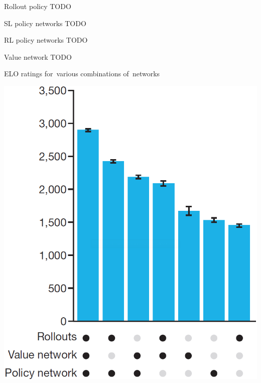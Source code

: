 \documentclass{beamer}
\newcommand{\todo}{\alert{TODO}}
\begin{document}
{    \begin{frame}{Rollout policy}
      \todo
    \end{frame}

    \begin{frame}{SL policy networks}
      \todo
    \end{frame}

    \begin{frame}{RL policy networks}
      \todo
    \end{frame}

    \begin{frame}{Value network}
      \todo
    \end{frame}

    \begin{frame}{ELO ratings for~various combinations of~networks}
      \begin{center}
        \includegraphics[height=.85\textheight]{../img/ELO_ratings_various_combinations_of_ANNs.png}
      \end{center}
    \end{frame}

}
\end{document}

